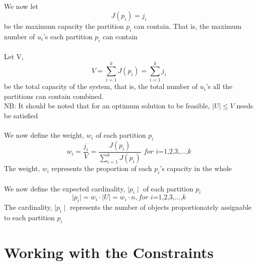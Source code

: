 \documentclass[a4paper,openany]{book}
\begin{document}
			\paragraph{}We now let
				\begin{equation}
					J(p_i) = j_i
				\end{equation}
				be the maximum capacity the partition $p_i$ can contain. That is, the maximum number of $u_i$'s each partition $p_i$ can contain
			\paragraph{}Let V,
				\begin{equation}
					V = \sum_{ i = 1 }^{k}{J(p_i)} = \sum_{i=1}^{k}{j_i}
				\end{equation}
				be the total capacity of the system, that is, the total number of $u_i$'s all the partitions can contain combined.\\
				NB: It should be noted that for an optimum solution to be feasible, $\mid U \mid \leq V$ needs be satisfied
			\paragraph{}We
				now define the weight, $w_i$ of each partition $p_i$
				\begin{equation}
					w_i = \frac{j_i}{V} = \frac{J(p_i)}{\sum_{i=1}^{k}{J(p_i)}}  \textit{ for i=1,2,3,}\dots\text{,}k
				\end{equation}
				The weight, $w_i$ represents the proportion of each $p_i$'s capacity in the whole
			\paragraph{}We 
				now define the expected cardinality, $\mid p_i \mid$ of each partition $p_i$
				\begin{equation}
					\mid p_i \mid = w_i \cdot \mid U \mid = w_i \cdot n, \textit{for i=1,2,3,}\dots\text{,}k
				\end{equation}
				The cardinality, $\mid p_i \mid$ represents the number of objects proportionately assignable to each partition $p_i$
		\section{Working with the Constraints}
\end{document}
